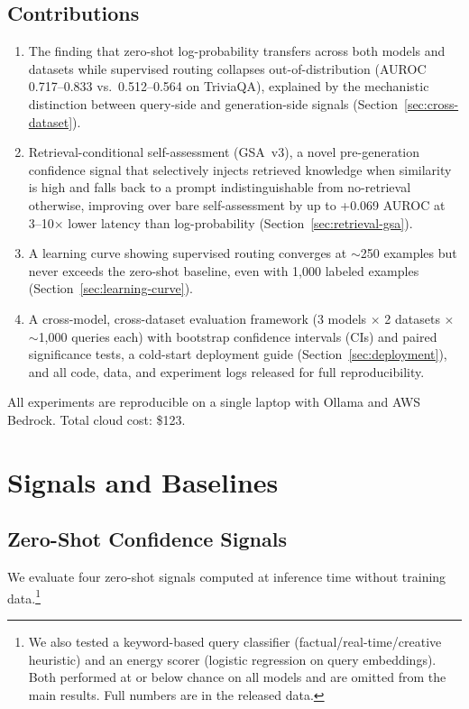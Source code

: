 \documentclass[journal]{IEEEtran}
\begin{document}
\subsection{Contributions}

\begin{enumerate}
\item The finding that zero-shot log-probability transfers across both models and datasets while supervised routing collapses out-of-distribution (AUROC 0.717--0.833 vs.\ 0.512--0.564 on TriviaQA), explained by the mechanistic distinction between query-side and generation-side signals (Section~\ref{sec:cross-dataset}).
\item Retrieval-conditional self-assessment (GSA~v3), a novel pre-generation confidence signal that selectively injects retrieved knowledge when similarity is high and falls back to a prompt indistinguishable from no-retrieval otherwise, improving over bare self-assessment by up to +0.069 AUROC at 3--10$\times$ lower latency than log-probability (Section~\ref{sec:retrieval-gsa}).
\item A learning curve showing supervised routing converges at ${\sim}$250 examples but never exceeds the zero-shot baseline, even with 1,000 labeled examples (Section~\ref{sec:learning-curve}).
\item A cross-model, cross-dataset evaluation framework (3 models $\times$ 2 datasets $\times$ ${\sim}$1,000 queries each) with bootstrap confidence intervals (CIs) and paired significance tests, a cold-start deployment guide (Section~\ref{sec:deployment}), and all code, data, and experiment logs released for full reproducibility.
\end{enumerate}

All experiments are reproducible on a single laptop with Ollama and AWS Bedrock. Total cloud cost: \$123.


\section{Signals and Baselines}
\label{sec:signals}

\subsection{Zero-Shot Confidence Signals}

We evaluate four zero-shot signals computed at inference time without training data.\footnote{We also tested a keyword-based query classifier (factual/real-time/creative heuristic) and an energy scorer (logistic regression on query embeddings). Both performed at or below chance on all models and are omitted from the main results. Full numbers are in the released data.}
\end{document}
